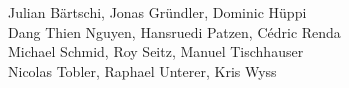 %
%
%
Julian Bärtschi,
Jonas Gründler,
Dominic Hüppi%
\\
Dang Thien Nguyen,
Hansruedi Patzen,
Cédric Renda%
\\
Michael Schmid,
Roy Seitz,
Manuel Tischhauser%
\\
Nicolas Tobler,
Raphael Unterer,
Kris Wyss%
